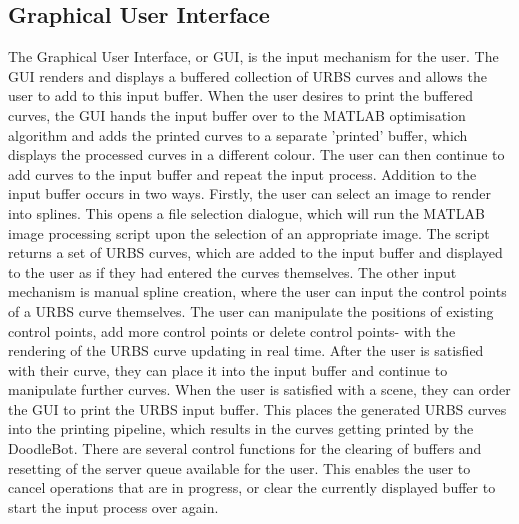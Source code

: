 \subsection{Graphical User Interface}
The Graphical User Interface, or GUI, is the input mechanism for the user. The GUI renders and displays a buffered collection of URBS curves and allows the user to add to this input buffer. When the user desires to print the buffered curves, the GUI hands the input buffer over to the MATLAB\textsuperscript{\textregistered} optimisation algorithm and adds the printed curves to a separate 'printed' buffer, which displays the processed curves in a different colour. The user can then continue to add curves to the input buffer and repeat the input process.
Addition to the input buffer occurs in two ways. Firstly, the user can select an image to render into splines. This opens a file selection dialogue, which will run the MATLAB\textsuperscript{\textregistered} image processing script upon the selection of an appropriate image. The script returns a set of URBS curves, which are added to the input buffer and displayed to the user as if they had entered the curves themselves.
The other input mechanism is manual spline creation, where the user can input the control points of a URBS curve themselves. The user can manipulate the positions of existing control points, add more control points or delete control points- with the rendering of the URBS curve updating in real time. After the user is satisfied with their curve, they can place it into the input buffer and continue to manipulate further curves.
When the user is satisfied with a scene, they can order the GUI to print the URBS input buffer. This places the generated URBS curves into the printing pipeline, which results in the curves getting printed by the DoodleBot.
There are several control functions for the clearing of buffers and resetting of the server queue available for the user. This enables the user to cancel operations that are in progress, or clear the currently displayed buffer to start the input process over again.